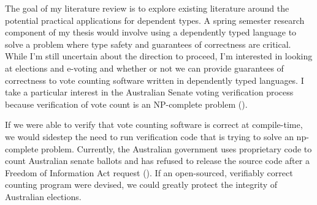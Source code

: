 The goal of my literature review is to explore existing literature around the
potential practical applications for dependent types. A spring semester research
component of my thesis would involve using a dependently typed language to solve
a problem where type safety and guarantees of correctness are critical. While
I'm still uncertain about the direction to proceed, I'm interested in looking at
elections and e-voting and whether or not we can provide guarantees of
correctness to vote counting software written in dependently typed languages. I
take a particular interest in the Australian Senate voting verification process
because verification of vote count is an NP-complete problem (\cite{aus_senate}). 

If we were able to verify that vote counting software is correct at
compile-time, we would sidestep the need to run verification code that is trying
to solve an np-complete problem. Currently, the Australian government uses
proprietary code to count Australian senate ballots and has refused to release
the source code after a Freedom of Information Act request (\cite{aus_senate_news}). If an
open-sourced, verifiably correct counting program were devised, we could greatly
protect the integrity of Australian elections. 